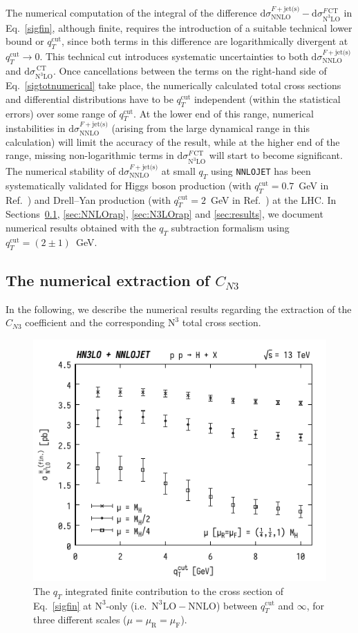 \documentclass[12pt]{article}
\DeclareRobustCommand{\mur}{\ensuremath{\mu_{\mathrm{R}}}\xspace}
\DeclareRobustCommand{\muR}{\mur}
\DeclareRobustCommand{\muf}{\ensuremath{\mu_{\mathrm{F}}}\xspace}
\DeclareRobustCommand{\muF}{\muf}
\DeclareRobustCommand{\qt}{\ensuremath{q_T}\xspace}
\DeclareRobustCommand{\qtcut}{\ensuremath{q_T^\mathrm{cut}}\xspace}
\DeclareRobustCommand{\rd}{\ensuremath{\mathrm{d}}}
\DeclareRobustCommand{\jets}{\text{jet(s)}\xspace}
\DeclareRobustCommand{\CT}{\text{CT}\xspace}
\DeclareRobustCommand{\LO}{\text{LO}\xspace}
\DeclareRobustCommand{\NNLO}{\text{NNLO}\xspace}
\DeclareRobustCommand{\N}[1]{\ensuremath{\text{N}^{#1}}} %
\begin{document}
The numerical computation of the integral of the difference $\rd{\sigma}_{\NNLO}^{F+\jets}-\rd{\sigma}_{\N3\LO}^{F\,\CT}$ in Eq.~\eqref{sigfin}, although finite, requires the introduction of a suitable technical lower bound or $\qtcut$, since both terms in this difference are logarithmically divergent at $\qtcut \to 0$. 
 This technical cut introduces systematic uncertainties to both $\rd{\sigma}_{\NNLO}^{F+\jets}$ and $\rd{\sigma}_{\N3\LO}^{\,\CT}$. Once cancellations between the terms on the right-hand side of Eq.~\eqref{sigtotnumerical} take place, the numerically calculated total cross sections and differential distributions have to be $\qtcut$ independent (within the statistical errors) over some range of $\qtcut$. At the lower end of this range, 
numerical instabilities in $\rd{\sigma}_{\NNLO}^{F+\jets}$ (arising from the large dynamical range in this calculation) 
will limit the accuracy of the result, while at the 
higher end of the range, missing non-logarithmic terms in  $\rd{\sigma}_{\N3\LO}^{F\,\CT}$ will start to 
become significant. 
The numerical stability of $\rd{\sigma}_{\NNLO}^{F+\jets}$ at small $\qt$ using \texttt{NNLOJET} has been systematically validated for Higgs boson production (with $\qtcut=0.7$~GeV in Ref.~\cite{Chen:2018pzu}) and Drell--Yan production (with $\qtcut=2$~GeV in Ref.~\cite{Bizon:2018foh}) at the LHC. In Sections~\ref{sec:numCN3}, \ref{sec:NNLOrap}, \ref{sec:N3LOrap} and \ref{sec:results}, we document numerical results obtained with the $\qt$ subtraction formalism using $\qtcut=(2\pm 1)$~GeV.


\subsection{The numerical extraction of \texorpdfstring{$C_{N3}$}{CN3}}
\label{sec:numCN3}

In the following, we describe the numerical results regarding the extraction of the $C_{N3}$ coefficient and the corresponding \N3\LO total cross section. 

\begin{figure}[tb]
\centering
\includegraphics[width=.6\linewidth]{./JHEP_figures/finN3LO}
\caption{\label{fig:finiten3lo}{The $\qt$ integrated finite contribution to the cross section of Eq.~\eqref{sigfin} at \N3\LO-only (i.e.\ $\N3\LO-\NNLO$) between $\qtcut$ and $\infty$, for three different scales ($\mu=\muR=\muF$).}}
\end{figure}
\end{document}
